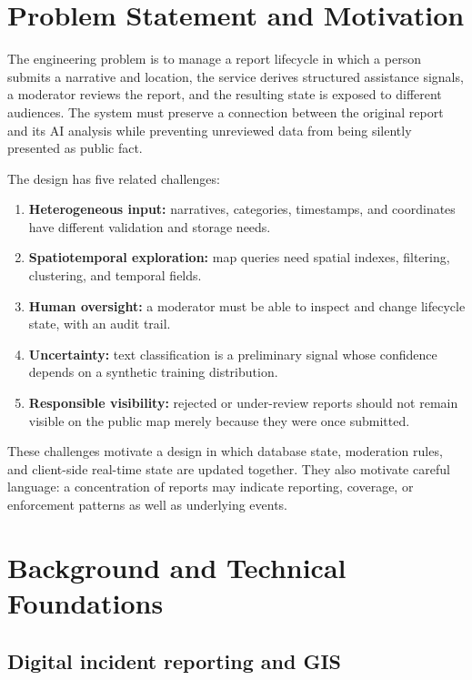 \documentclass[11pt]{article}
\begin{document}
\section{Problem Statement and Motivation}
\label{sec:problem}

The engineering problem is to manage a report lifecycle in which a person
submits a narrative and location, the service derives structured assistance
signals, a moderator reviews the report, and the resulting state is exposed
to different audiences. The system must preserve a connection between the
original report and its AI analysis while preventing unreviewed data from
being silently presented as public fact.

The design has five related challenges:
\begin{enumerate}
  \item \textbf{Heterogeneous input:} narratives, categories, timestamps, and
  coordinates have different validation and storage needs.
  \item \textbf{Spatiotemporal exploration:} map queries need spatial indexes,
  filtering, clustering, and temporal fields.
  \item \textbf{Human oversight:} a moderator must be able to inspect and
  change lifecycle state, with an audit trail.
  \item \textbf{Uncertainty:} text classification is a preliminary signal
  whose confidence depends on a synthetic training distribution.
  \item \textbf{Responsible visibility:} rejected or under-review reports
  should not remain visible on the public map merely because they were once
  submitted.
\end{enumerate}

These challenges motivate a design in which database state, moderation rules,
and client-side real-time state are updated together. They also motivate
careful language: a concentration of reports may indicate reporting,
coverage, or enforcement patterns as well as underlying events.

\section{Background and Technical Foundations}
\label{sec:background}

\subsection{Digital incident reporting and GIS}
\end{document}
